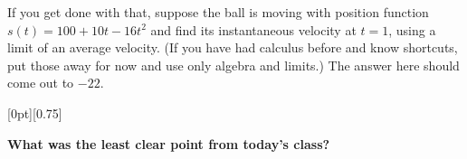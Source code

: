 \documentclass[11pt]{article}
\newcommand{\cuthere}{%
\noindent
\raisebox{-2.8pt}[0pt][0.75\baselineskip]{\small\ding{34}}
\unskip{\tiny\dotfill}
}
\def\ra{\rightarrow}
\def\pageturn{\vfill 
\begin{flushright}
	\begin{small}
		Continued $\ra$
	\end{small}
\end{flushright} \newpage}
\begin{document}
If you get done with that, suppose the ball is moving with position function $s(t) = 100 + 10t - 16t^2$ and find its instantaneous velocity at $t = 1$, using a limit of an average velocity. (If you have had calculus before and know shortcuts, put those away for now and use only algebra and limits.) The answer here should come out to $-22$. 


% 
% 
% 
% 
% 		
% 	
% 	
% 	




\vfill

\cuthere

\noindent
\textbf{What was the least clear point from today's class?}

\vspace{1in}
\end{document}
